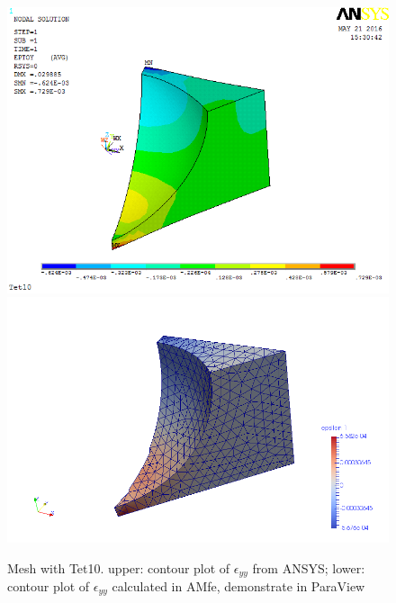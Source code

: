 \begin{figure}[htbp]
	\begin{center}
		\includegraphics[width=13cm,clip]{Tet10_Eyy.png} 		
		\includegraphics[width=13cm,clip]{Tet10_Eyy_P.png} 		
		\caption{Mesh with Tet10. upper: contour plot of $\epsilon_{yy}$ from ANSYS; lower: contour plot of $\epsilon_{yy}$ calculated in AMfe, demonstrate in ParaView} \label{fig: Tet10_Eyy}
	\end{center}
\end{figure}
\clearpage 

